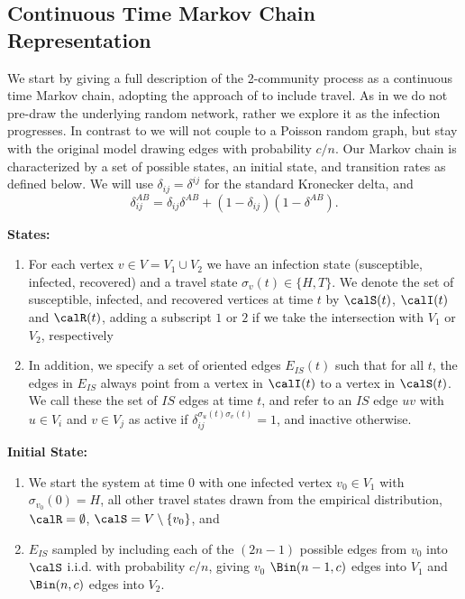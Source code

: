 \documentclass[11pt]{article}
\begin{document}
\subsection{Continuous Time Markov Chain Representation}
We start by giving a full description of the 2-community process as a continuous time Markov chain, adopting the approach of
\cite{Ball2010, borgs2024lawlargenumberssir} to include travel.  As in \cite{Ball2010, borgs2024lawlargenumberssir} we do not pre-draw the underlying random network, rather we explore it as the infection progresses. In contrast to \cite{Ball2010, borgs2024lawlargenumberssir} we will not couple to a Poisson random graph, but stay with the original model drawing edges with probability $c/n$.  Our Markov chain is characterized by a set of possible states, an initial state, and transition rates as defined below.  We will use $\delta_{ij}=\delta^{ij}$ for the standard Kronecker delta, and
$$\delta_{ij}^{AB}=\delta_{ij}\delta^{AB}+(1-\delta_{ij})(1-\delta^{AB}).
$$

\medskip


\noindent\textbf{States:}
\begin{enumerate}
    \item For each vertex $v\in V=V_1\cup V_2$ we have an infection state (susceptible, infected, recovered) and a travel state $\sigma_v(t)\in \{H,T\}$.  We denote the set of susceptible, infected, and recovered vertices at time $t$ by $\calS(t)$, $\calI(t)$ and $\calR(t)$, adding a subscript $1$ or $2$ if we take the intersection with $V_1$ or $V_2$, respectively
    \item In addition, we specify a set of oriented edges $E_{IS}(t)$ such that for all $t$, the edges in $E_{IS}$
    always point from a vertex in $\calI(t)$ to a vertex in $\calS(t)$.  We call these the set of $IS$ edges at time $t$, and refer to an $IS$ edge $uv$ with $u\in V_i$ and $v\in V_j$ as active if $\delta_{ij}^{\sigma_u(t)\sigma_v(t)}=1$, and inactive otherwise.
\end{enumerate}

\noindent\textbf{Initial State:}
\begin{enumerate}
    \item We start the system at time $0$ with 
one infected vertex $v_0\in V_1$ with $\sigma_{v_0}(0)=H$, all other travel states drawn from the empirical distribution, 
$\calR=\emptyset$,  $\calS=V\setminus \{v_0\}$, and 
\item  $E_{IS}$ sampled by including each of the $(2n-1)$ possible edges from $v_0$ into $\calS$ i.i.d. with probability $c/n$, giving $v_0$ $\Bin(n-1,c)$ edges into $V_1$ and $\Bin(n,c)$ edges into $V_2$.
\end{enumerate}
\end{document}
